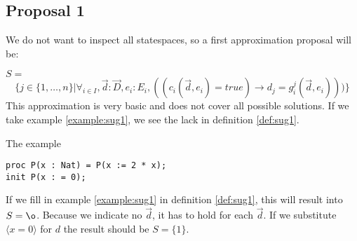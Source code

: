 \documentclass[a4paper,10pt]{article}
\newcommand{\lpe}{linear process equation}
\newcommand{\ovr}{\overrightarrow}
\newcommand{\pp}{process parameter}
\begin{document}
\subsection{Proposal 1} \label{sec:prop1}
We do not want to inspect all statespaces, so a first approximation proposal will be:
\begin{defn} \label{def:sug1}
$S=$
\begin{displaymath}
\lbrace   
j \in \lbrace 1, \ldots , n \rbrace \vert \forall_{i\in I}, \ovr{d}: \ovr{D} , e_i: E_i, ((c_i(\ovr{d},e_i) = true)  \rightarrow d_j = g_i^j(\ovr{d},e_i)))\rbrace
\end{displaymath}
This approximation is very basic and does not cover all possible solutions. If we take example
\ref{example:sug1}, we see the lack in definition \ref{def:sug1}.
\begin{example} \label{example:sug1} The example \\
\begin{verbatim}
proc P(x : Nat) = P(x := 2 * x);
init P(x : = 0);
\end{verbatim}

\end{example}
If we fill in example \ref{example:sug1} in definition \ref{def:sug1}, this will result into $S = \o$. 
Because we indicate no $\ovr{d}$, it has to hold for each $\ovr{d}$. If we substitute $\langle x=0 \rangle$ for $d$
the result should be $S= \lbrace 1 \rbrace$. 
\end{defn}
\end{document}

